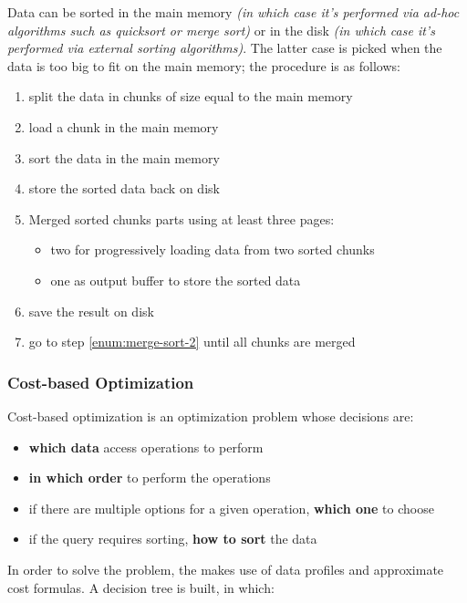 \documentclass[english]{article}
\begin{document}
Data can be sorted in the main memory \textit{(in which case it's performed via ad-hoc algorithms such as quicksort or merge sort)} or in the disk \textit{(in which case it's performed via external sorting algorithms)}.
The latter case is picked when the data is too big to fit on the main memory; the procedure is as follows:

\begin{enumerate}
  \item split the data in chunks of size equal to the main memory
        \item\label{enum:merge-sort-2} load a chunk in the main memory
  \item sort the data in the main memory
  \item store the sorted data back on disk
  \item Merged sorted chunks parts using at least three pages:
        \begin{itemize}
          \item two for progressively loading data from two sorted chunks
          \item one as output buffer to store the sorted data
        \end{itemize}
  \item save the result on disk
  \item go to step \ref{enum:merge-sort-2} until all chunks are merged
\end{enumerate}

\subsubsection{Cost-based Optimization}

Cost-based optimization is an optimization problem whose decisions are:

\begin{itemize}
  \item \textbf{which data} access operations to perform
  \item \textbf{in which order} to perform the operations
  \item if there are multiple options for a given operation, \textbf{which one }to choose
  \item if the query requires sorting, \textbf{how to sort} the data
\end{itemize}

In order to solve the problem, the \dbms makes use of data profiles and approximate cost formulas.
A decision tree is built, in which:
\end{document}
